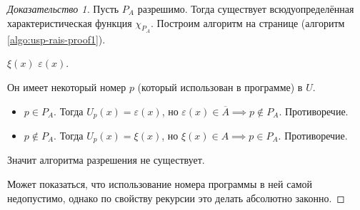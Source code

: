 \documentclass[a4paper, 12pt]{article}
\begin{document}
\begin{proof}[Доказательство 1]
    Пусть $P_A$ разрешимо. Тогда существует всюдуопределённая
    характеристическая функция $\chi_{P_A}$. 
    Построим алгоритм на странице \pageref{algo:usp-rais-proof1} 
    (алгоритм \ref{algo:usp-rais-proof1}).
    \begin{algorithm}
        \caption{Алгоритм, создающий противоречие для разрешимости $P_A$ в док-ве 1}
        \label{algo:usp-rais-proof1}
        \begin{algorithmic}
                    \State \Return $\xi(x)$
                \Else 
                    \State \Return $\varepsilon(x)$.
                \EndIf
            \EndFunction
        \end{algorithmic}
    \end{algorithm}
    
    Он имеет некоторый номер $p$ (который использован в программе) в $U$.
    \begin{itemize}
            \item $p \in P_A$. Тогда $U_p(x) = \varepsilon(x)$,
                но $\varepsilon(x) \in \overline{A} \implies
                p \notin P_A$. Противоречие.

            \item $p \notin P_A$. Тогда $U_p(x) = \xi(x)$, но
                $\xi(x) \in A \implies p \in P_A$. Противоречие.
    \end{itemize}
    Значит алгоритма разрешения не существует.

    Может показаться, что использование номера программы в ней самой недопустимо,
    однако по свойству рекурсии это делать абсолютно законно.
\end{proof}
\end{document}
